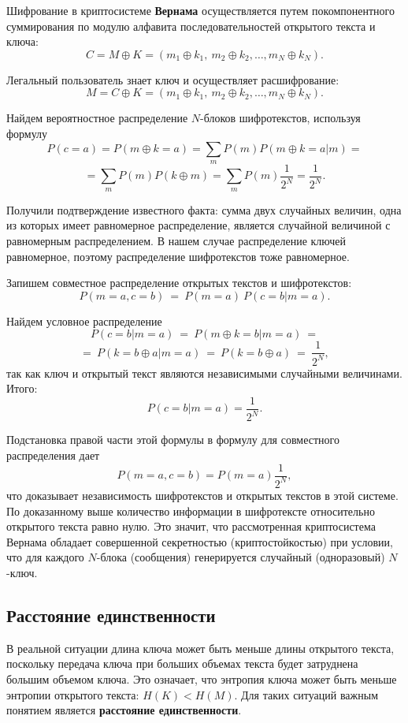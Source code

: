 Шифрование в криптосистеме \textbf{Вернама} осуществляется путем покомпонентного суммирования по модулю алфавита последовательностей открытого текста и ключа:
    \[ C = M \oplus K = (m_1 \oplus k_1, ~ m_2 \oplus k_2, \dots,  m_N \oplus k_N). \]

Легальный пользователь знает ключ и осуществляет расшифрование:
    \[ M =C \oplus K = (m_1 \oplus k_1, ~ m_2 \oplus k_2, \dots, m_N \oplus k_N). \]

Найдем вероятностное распределение $N$-блоков шифротекстов, используя формулу
    \[ P(c = a) = P(m \oplus k = a) = \sum_{m} P(m) P(m \oplus k = a | m) = \]
    \[ = \sum_{m} P(m) P(k \oplus m) = \sum_{m} P(m) \frac{1}{2^N} = \frac{1}{2^N}. \]

Получили подтверждение известного факта: сумма двух случайных величин, одна из которых  имеет равномерное распределение, является случайной величиной с равномерным распределением. В нашем случае распределение ключей  равномерное, поэтому распределение шифротекстов тоже равномерное.

Запишем совместное распределение открытых текстов и шифротекстов:
    \[ P(m = a, c = b) ~=~ P(m = a) ~ P(c = b | m = a). \]

Найдем условное распределение
    \[ P(c = b | m = a) ~=~ P(m \oplus k = b | m = a) ~= \]
    \[ =~ P(k = b \oplus a | m = a) ~=~ P(k = b \oplus a) ~=~ \frac{1}{2^N}, \]
так как ключ и открытый текст являются независимыми случайными величинами. Итого:
    \[ P(c=b | m=a) = \frac{1}{2^N}. \]

Подстановка правой части этой формулы в формулу для совместного распределения дает
    \[ P(m=a,c=b)=P(m=a)\frac{1}{2^N}, \]
что доказывает независимость шифротекстов и открытых текстов в этой системе. По доказанному выше количество информации в шифротексте относительно открытого текста равно нулю. Это значит, что рассмотренная криптосистема Вернама обладает совершенной секретностью (криптостойкостью) при условии, что для каждого $N$-блока (сообщения) генерируется случайный (одноразовый) $N$-ключ.


\subsection{Расстояние единственности}

В реальной ситуации длина ключа может быть меньше длины открытого текста, поскольку передача ключа при больших объемах текста будет затруднена большим объемом ключа.  Это означает, что энтропия ключа может быть меньше энтропии открытого текста: $H(K)< H(M)$. Для таких ситуаций важным понятием является \textbf{расстояние единственности}.

